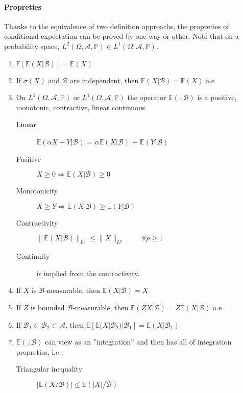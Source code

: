 \documentclass[a4paper,10pt]{article}
\begin{document}
\paragraph{Propreties } Thanks to the equivalence of two definition approachs, the propreties of conditional expectation can be proved by one way or other. Note that on a probability space, $L^2(\Omega, \mathcal{A}, \mathbb{P}) \in L^1(\Omega, \mathcal{A}, \mathbb{P})$.
\begin{enumerate}
 \item $\mathbb{E}[\mathbb{E}(X|\mathcal{B})] = \mathbb{E}(X)$
 \item If $\sigma(X)$ and $\mathcal{B}$ are independent, then $\mathbb{E}(X|\mathcal{B}) = \mathbb{E}(X)$ a.e
 \item On $L^2(\Omega, \mathcal{A}, \mathbb{P})$ or $L^1(\Omega, \mathcal{A}, \mathbb{P})$ the operator $\mathbb{E}(.|\mathcal{B})$ is a positive, monotonic, contractive, linear continuous.
 \begin{description}
  \item [Linear] $\mathbb{E}(\alpha X + Y|\mathcal{B})$ = $\alpha \mathbb{E}(X|\mathcal{B})$ + $\mathbb{E}(Y|\mathcal{B})$
  \item [Positive] $X \geq 0 \Longrightarrow \mathbb{E}(X|\mathcal{B}) \geq 0 $ 
  \item [Monotonicity] $X \geq Y \Longrightarrow \mathbb{E}(X|\mathcal{B}) \geq \mathbb{E}(Y|\mathcal{B})$
  \item [Contractivity] $\| \mathbb{E}(X|\mathcal{B}) \|_{L^p} \leq \| X \|_{L^p} \hspace{1cm} \forall p \geq 1$
  \item [Continuity] is implied from the contractivity. 
 \end{description}
  \item If $X$ is $\mathcal{B}$-measurable, then $ \mathbb{E}(X|\mathcal{B}) = X$
  \item If $Z$ is bounded $\mathcal{B}$-measurable, then $ \mathbb{E}(ZX|\mathcal{B}) = Z\mathbb{E}(X|\mathcal{B})$ a.e
  \item If $\mathcal{B}_1 \subset \mathcal{B}_2 \subset \mathcal{A}$, then $\mathbb{E}[ \mathbb{E}(X|\mathcal{B}_2) | \mathcal{B}_1] = \mathbb{E}(X|\mathcal{B}_1)$
  \item $\mathbb{E}(.|\mathcal{B})$ can view as an ''integration'' and then has all of integration propreties, i.e :
  \begin{description}
   \item [Triangular inequality] $|\mathbb{E}(X/\mathcal{B})| \leq \mathbb{E}(|X|/\mathcal{B})$

\end{description}
\end{enumerate}
\end{document}
